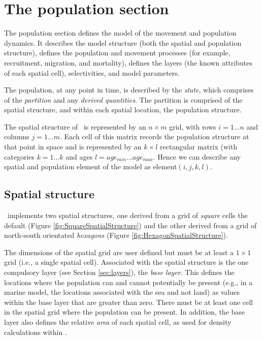 \section{The population section\label{sec:population-section}}

The population section defines the model of the movement and population dynamics. It describes the model structure (both the spatial and population structure), defines the population and movement processes (for example, recruitment, migration, and mortality), defines the layers (the known attributes of each spatial cell), selectivities, and model parameters.

The population, at any point in time, is described by the \emph{state}, which comprises of the \emph{partition} and any \emph{derived quantities}. The partition is comprised of the spatial structure, and within each spatial location, the population structure. 

The spatial structure of \SPM\ is represented by an $n \times m$ grid, with rows $i=1 \dots n$ and columns $j=1 \ldots m$. Each cell of this matrix records the population structure at that point in space and is represented by an $k \times l$ rectangular matrix (with categories $k=1 \ldots k$ and ages $l=age_{min} \ldots age_{max}$. Hence we can describe any spatial and population element of the model as element$(i,j,k,l)$. 

\subsection{Spatial structure}

\SPM\ implements two spatial structures, one derived from a grid of \emph{square} cells \textemdash the default (Figure \ref{fig:SquareSpatialStructure}) and the other derived from a grid of north-south orientated \emph{hexagons} (Figure \ref{fig:HexagonSpatialStructure}). 

The dimensions of the spatial grid are user defined but must be at least a $1 \times 1$ grid (i.e., a single spatial cell). Associated with the spatial structure is the one compulsory layer (see Section \ref{sec:layers}), the \emph{base layer}. This defines the locations where the population can and cannot potentially be present (e.g., in a marine model, the locations associated with the sea and not land) as values within the base layer that are greater than zero. There must be at least one cell in the spatial grid where the population can be present. In addition, the base layer also defines the relative \emph{area} of each spatial cell, as used for density calculations within \SPM.

